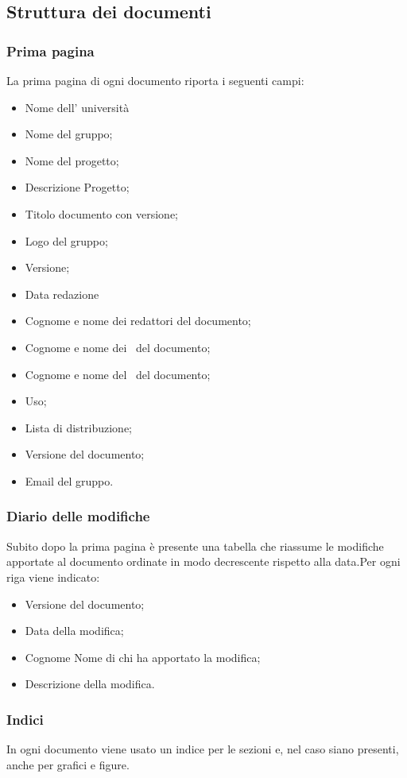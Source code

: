 \documentclass[../NormeDiProgetto.tex]{subfiles}
\begin{document}
		\subsection{Struttura dei documenti}
		
		\subsubsection{Prima pagina}
		La prima pagina di ogni documento riporta i seguenti campi:
		\begin{itemize}
			\item Nome dell' università
			\item Nome del gruppo;
			\item Nome del progetto;
			\item Descrizione Progetto;
			\item Titolo documento con versione;
			\item Logo del gruppo;
			\item Versione;
			\item Data redazione
			\item Cognome e nome dei redattori del documento;
			\item Cognome e nome dei \verificatori\ del documento;
			\item Cognome e nome del \responsabilediprogetto\ del documento;
			\item Uso;
			\item Lista di distribuzione;
			\item Versione del documento;
			\item Email del gruppo.
		\end{itemize} 
		\subsubsection{Diario delle modifiche}
		Subito dopo la prima pagina è presente una tabella che riassume le modifiche apportate al documento ordinate in modo decrescente	rispetto alla data.Per ogni riga viene indicato:
		\begin{itemize}
			\item Versione del documento;
			\item Data della modifica;
			\item Cognome Nome di chi ha apportato la modifica;
			\item Descrizione della modifica.
		\end{itemize}
		\subsubsection{Indici}
		In ogni documento viene usato un indice per le sezioni e, nel caso siano presenti, anche per grafici e figure. 
\end{document}
